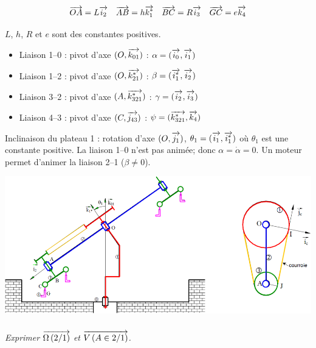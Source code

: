 \documentclass[10pt,oneside]{article}
\begin{document}
{$$
\overrightarrow{OA}=L\overrightarrow{i_2} \quad \overrightarrow{AB}=h\overrightarrow{k_1^*} \quad \overrightarrow{BC}=R\overrightarrow{i_3} \quad \overrightarrow{GC}=e\overrightarrow{k_4} 
$$

$L$, $h$, $R$ et $e$ sont des constantes positives.

\begin{itemize}
\item Liaison 1--0 : pivot d'axe $(O,\overrightarrow{k_{01}})$ : $\alpha = (\overrightarrow{i_0},\overrightarrow{i_1})$
\item Liaison 1--2 : pivot d'axe $(O,\overrightarrow{k_{21}^*})$ : $\beta = (\overrightarrow{i_1^*},\overrightarrow{i_2})$
\item Liaison 3--2 : pivot d'axe $(A,\overrightarrow{k_{321}^*})$ : $\gamma = (\overrightarrow{i_2},\overrightarrow{i_3})$
\item Liaison 4--3 : pivot d'axe $(C,\overrightarrow{j_{43}})$ : $\psi = (\overrightarrow{k_{321}^*},\overrightarrow{k_4})$
\end{itemize}

Inclinaison du plateau 1 : rotation d'axe $(O,\overrightarrow{j_1})$, $\theta_1=(\overrightarrow{i_1},\overrightarrow{i_1^*})$ où $\theta_1$ est une constante positive. La liaison 1--0 n'est pas animée; donc $\alpha=\dot{\alpha}=0$. Un moteur permet d'animer la liaison 2--1 ($\beta\neq0$). 


\begin{center}
 \includegraphics[width=\textwidth]{png/exo2}
\end{center}
}

\subparagraph{}
\textit{Exprimer $\overrightarrow{\Omega\left( {2}/{1}\right)}$ et $\overrightarrow{V\left( {A} \in {2}/{1}\right)}$.}
\end{document}
